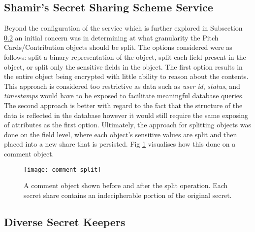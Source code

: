 \subsection{Shamir's Secret Sharing Scheme Service}
Beyond the configuration of the service which is further explored in Subsection \ref{SS:diverse_secret_keepers} an initial concern was in determining at what granularity the Pitch Cards/Contribution objects should be split. The options considered were as follows: split a binary representation of the object, split each field present in the object, or split only the sensitive fields in the object. The first option results in the entire object being encrypted with little ability to reason about the contents. This approach is considered too restrictive as data such as \textit{user id}, \textit{status}, and \textit{timestamps} would have to be exposed to facilitate meaningful database queries. The second approach is better with regard to the fact that the structure of the data is reflected in the database however it would still require the same exposing of attributes as the first option. Ultimately, the approach for splitting objects was done on the field level, where each object's sensitive values are split and then placed into a new share that is persisted. Fig \ref{fig:comment_split} visualises how this done on a comment object. 

\begin{figure}[ht]
    \centering
    \texttt{[image: comment\_split]}
    \caption{A comment object shown before and after the split operation. Each secret share contains an indecipherable portion of the original secret.}
    \label{fig:comment_split}
\end{figure}

\subsection{Diverse Secret Keepers}\label{SS:diverse_secret_keepers}

